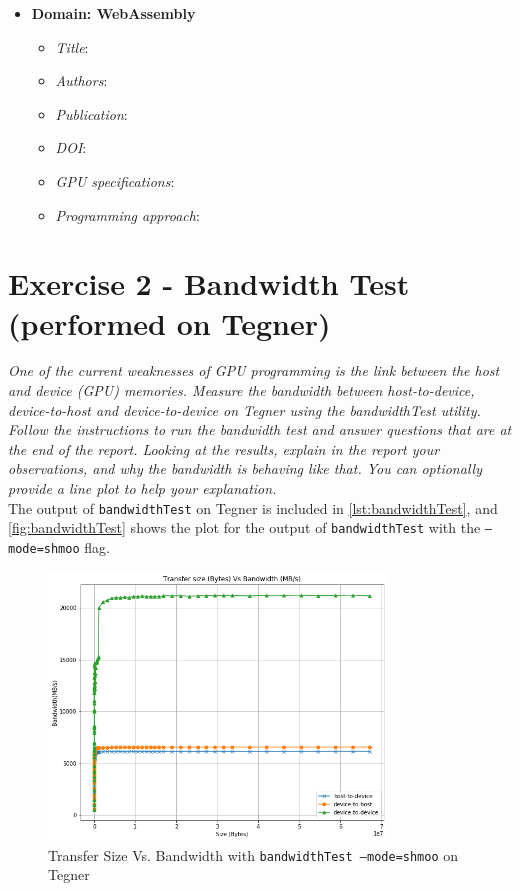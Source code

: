 \documentclass[12pt]{article}
\begin{document}
\begin{enumerate}
\begin{itemize}
        \item \textbf{Domain: WebAssembly}
        \begin{itemize}
            \item \textit{Title}:
            \item \textit{Authors}:
            \item \textit{Publication}:
            \item \textit{DOI}:
            \item \textit{GPU specifications}:
            \item \textit{Programming approach}:
        \end{itemize}
    \end{itemize}
\end{enumerate}

\section{Exercise 2 - Bandwidth Test (performed on Tegner)}
\textit{One of the current weaknesses of GPU programming is the link between the host and device (GPU) memories. Measure the bandwidth between host-to-device, device-to-host and device-to-device on Tegner using the bandwidthTest utility. Follow the instructions to run the bandwidth test and answer questions that are at the end of the report. Looking at the results, explain in the report your observations, and why the bandwidth is behaving like that. You can optionally provide a line plot to help your explanation.}\\


The output of \texttt{bandwidthTest} on Tegner is included in \autoref{lst:bandwidthTest}, and \autoref{fig:bandwidthTest} shows the plot for the output of \texttt{bandwidthTest} with the \texttt{--mode=shmoo} flag.

\begin{figure}[H]
\centering
\includegraphics[width=0.8\textwidth]{bandwidthTest.png}
\caption{Transfer Size Vs. Bandwidth with \texttt{bandwidthTest --mode=shmoo} on Tegner}
\label{fig:bandwidthTest}
\end{figure}
\end{document}
